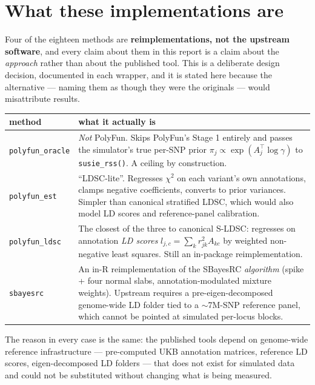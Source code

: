 \documentclass[11pt,a4paper]{article}
\begin{document}
\section{What these implementations are}\label{sec:fidelity}

Four of the eighteen methods are \textbf{reimplementations, not the upstream
software}, and every claim about them in this report is a claim about the
\emph{approach} rather than about the published tool. This is a deliberate
design decision, documented in each wrapper, and it is stated here because the
alternative --- naming them as though they were the originals --- would
misattribute results.

\begin{center}\small
\begin{tabular}{lp{10.6cm}}\toprule
method & what it actually is\\\midrule
\texttt{polyfun\_oracle} & \emph{Not} PolyFun. Skips PolyFun's Stage 1 entirely
and passes the simulator's true per-SNP prior
$\pi_j\propto\exp(A_j^\top\log\gamma)$ to \texttt{susie\_rss()}. A ceiling by
construction.\\[2pt]
\texttt{polyfun\_est} & ``LDSC-lite''. Regresses $\chi^2$ on each variant's own
annotations, clamps negative coefficients, converts to prior variances. Simpler
than canonical stratified LDSC, which would also model LD scores and
reference-panel calibration.\\[2pt]
\texttt{polyfun\_ldsc} & The closest of the three to canonical S-LDSC: regresses
on annotation \emph{LD scores} $l_{j,c}=\sum_k r^2_{jk}A_{kc}$ by weighted
non-negative least squares. Still an in-package reimplementation.\\[2pt]
\texttt{sbayesrc} & An in-R reimplementation of the SBayesRC \emph{algorithm}
(spike + four normal slabs, annotation-modulated mixture weights). Upstream
requires a pre-eigen-decomposed genome-wide LD folder tied to a $\sim$7M-SNP
reference panel, which cannot be pointed at simulated per-locus blocks.\\
\bottomrule\end{tabular}\end{center}

The reason in every case is the same: the published tools depend on genome-wide
reference infrastructure --- pre-computed UKB annotation matrices, reference LD
scores, eigen-decomposed LD folders --- that does not exist for simulated data
and could not be substituted without changing what is being measured.
\end{document}
